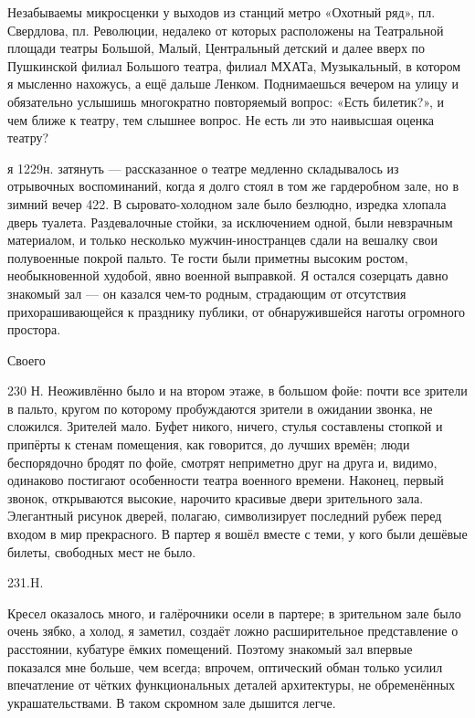 Незабываемы микросценки у выходов из станций метро «Охотный ряд», пл. Свердлова, пл. Революции, недалеко от которых расположены на Театральной площади театры Большой, Малый, Центральный детский и далее вверх по Пушкинской филиал Большого театра, филиал МХАТа, Музыкальный, в котором я мысленно нахожусь, а ещё дальше Ленком. Поднимаешься вечером на улицу и обязательно услышишь многократно повторяемый вопрос: «Есть билетик?», и чем ближе к театру, тем слышнее вопрос. Не есть ли это наивысшая оценка театру?

я 1229н. затянуть — рассказанное о театре медленно складывалось из отрывочных воспоминаний, когда я долго стоял в том же гардеробном зале, но в зимний вечер 422. В сыровато-холодном зале было безлюдно, изредка хлопала дверь туалета. Раздевалочные стойки, за исключением одной, были невзрачным материалом, и только несколько мужчин-иностранцев сдали на вешалку свои полувоенные покрой пальто. Те гости были приметны высоким ростом, необыкновенной худобой, явно военной выправкой. Я остался созерцать давно знакомый зал — он казался чем-то родным, страдающим от отсутствия прихорашивающейся к празднику публики, от обнаружившейся наготы огромного простора.

Своего

230 Н.
Неоживлённо было и на втором этаже, в большом фойе: почти все зрители в пальто, кругом по которому пробуждаются зрители в ожидании звонка, не сложился. Зрителей мало. Буфет никого, ничего, стулья составлены стопкой и припёрты к стенам помещения, как говорится, до лучших времён; люди беспорядочно бродят по фойе, смотрят неприметно друг на друга и, видимо, одинаково постигают особенности театра военного времени. Наконец, первый звонок, открываются высокие, нарочито красивые двери зрительного зала. Элегантный рисунок дверей, полагаю, символизирует последний рубеж перед входом в мир прекрасного. В партер я вошёл вместе с теми, у кого были дешёвые билеты, свободных мест не было.

231.H.

Кресел оказалось много, и галёрочники осели в партере; в зрительном зале было очень зябко, а холод, я заметил, создаёт ложно расширительное представление о расстоянии, кубатуре ёмких помещений. Поэтому знакомый зал впервые показался мне больше, чем всегда; впрочем, оптический обман только усилил впечатление от чётких функциональных деталей архитектуры, не обременённых украшательствами. В таком скромном зале дышится легче.

